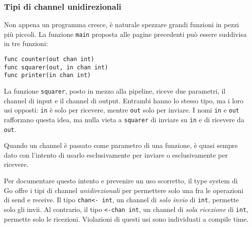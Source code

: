 \documentclass[../../../thesis.tex]{subfiles}
\begin{document}
    \subsubsection{Tipi di channel unidirezionali}
    Non appena un programma cresce, è naturale spezzare grandi funzioni in pezzi più piccoli.
    La funzione \verb"main" proposta alle pagine precedenti può essere suddivisa in tre funzioni:
    \begin{lstlisting}[frame = single,label={lst:lstlisting7-4-3.1}]
func counter(out chan int)
func squarer(out, in chan int)
func printer(in chan int)
    \end{lstlisting}
    La funzione \verb"squarer", posto in mezzo alla pipeline, riceve due parametri, il channel di input e il channel di output.
    Entrambi hanno lo stesso tipo, ma i loro usi opposti: \verb"in" è solo per ricevere, mentre \verb"out" solo per inviare.
    I nomi \verb"in" e \verb"out" rafforzano questa idea, ma nulla vieta a \verb"squarer" di inviare su \verb"in" e di ricevere da \verb"out".
    \hfill \vspace{12pt}

    Quando un channel è passato come parametro di una funzione, è quasi sempre dato con l'intento di usarlo esclusivamente per inviare o esclusivamente per ricevere.
    \hfill \vspace{12pt}

    Per documentare questo intento e prevenire un uso scorretto, il type system di Go offre i tipi di channel \textit{unidirezionali} per permettere solo una fra le operazioni di send e receive.
    Il tipo \verb"chan<- int", un channel di \textit{solo invio} di \verb"int", permette solo gli invii.
    Al contrario, il tipo \verb"<-chan int", un channel di \textit{sola ricezione} di \verb"int", permette solo le ricezioni.
    Violazioni di questi usi sono individuati a compile time.
    \hfill \vspace{12pt}
\end{document}

